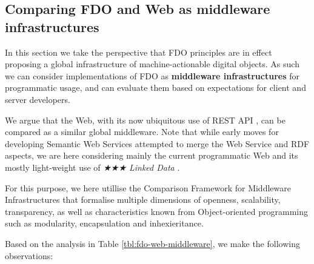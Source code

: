 \documentclass[fleqn,10pt,lineno]{wlpeerjlua}
\begin{document}
\hypertarget{sec:middleware}{%
\subsection*{Comparing FDO and Web as middleware infrastructures}\label{sec:middleware}}

In this section we take the perspective that FDO principles are in effect proposing a global infrastructure of machine-actionable digital objects. As such we can consider implementations of FDO as \textbf{middleware infrastructures} for programmatic usage, and can evaluate them based on expectations for client and server developers.

We argue that the Web, with its now ubiquitous use of REST API \autocite{fieldingArchitecturalStylesDesign2000a}, can be compared as a similar global middleware. Note that while early moves for developing Semantic Web Services \autocite{fenselSemanticWebServices2011} attempted to merge the Web Service and RDF aspects, we are here considering mainly the current programmatic Web and its mostly light-weight use of \emph{★★★ Linked Data} \autocite{OpenData}.

For this purpose, we here utillise the Comparison Framework for Middleware Infrastructures \autocite{zarrasComparisonFrameworkMiddleware2004a} that formalise multiple dimensions of openness, scalability, transparency, as well as characteristics known from Object-oriented programming such as modularity, encapsulation and inhexieritance.




Based on the analysis in Table \ref{tbl:fdo-web-middleware}, we make the following observations:
\end{document}
